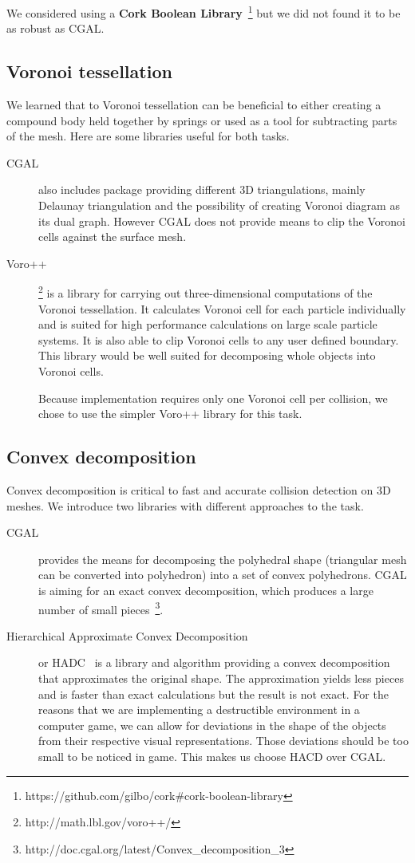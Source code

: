 We considered using a \textbf{Cork Boolean Library}~\footnote{https://github.com/gilbo/cork\#cork-boolean-library} but we did not found it to be as robust as CGAL.

\subsection{Voronoi tessellation}
We learned that to Voronoi tessellation can be beneficial to either creating a compound body held together by springs or used as a tool for subtracting parts of the mesh. Here are some libraries useful for both tasks.

\begin{description}
\item[CGAL] also includes package providing different 3D triangulations, mainly Delaunay triangulation and the possibility of creating Voronoi diagram as its dual graph. However CGAL does not provide means to clip the Voronoi cells against the surface mesh.

\item[Voro++]\footnote{http://math.lbl.gov/voro++/} is a library for carrying out three-dimensional computations of the Voronoi tessellation. It calculates Voronoi cell for each particle individually and is suited for high performance calculations on large scale particle systems. It is also able to clip Voronoi cells to any user defined boundary. This library would be well suited for decomposing whole objects into Voronoi cells. 

Because implementation requires only one Voronoi cell per collision, we chose to use the simpler Voro++ library for this task. 
\end{description}


\subsection{Convex decomposition}
\label{sec:decompositionLib}
Convex decomposition is critical to fast and accurate collision detection on 3D meshes. We introduce two libraries with different approaches to the task.
\begin{description}
\item[CGAL] provides the means for decomposing the polyhedral shape (triangular mesh can be converted into polyhedron) into a set of convex polyhedrons. CGAL is aiming for an exact convex decomposition, which produces a large number of small pieces~\footnote{http://doc.cgal.org/latest/Convex\_decomposition\_3}.

\item[Hierarchical Approximate Convex Decomposition] or HADC~\cite{HACD} is a library and algorithm providing a convex decomposition that approximates the original shape. The approximation yields less pieces and is faster than exact calculations but the result is not exact. For the reasons that we are implementing a destructible environment in a computer game, we can allow for deviations in the shape of the objects from their respective visual representations. Those deviations should be too small to be noticed in game. This makes us choose HACD over CGAL.
\end{description}

